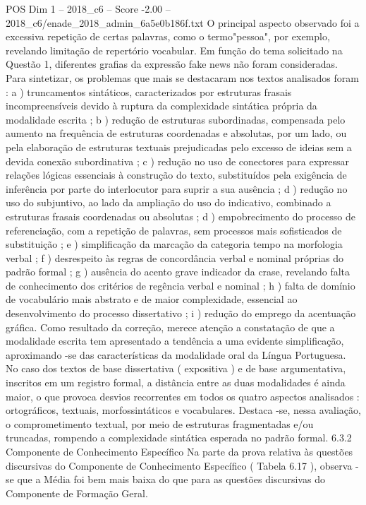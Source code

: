 \begin{textsample}{POS Dim 1 – 2018\_c6 – Score -2.00 – 2018\_c6/enade\_2018\_admin\_6a5e0b186f.txt}
O principal aspecto observado foi a excessiva repetição de certas palavras, como o termo"pessoa", por exemplo, revelando limitação de repertório vocabular.
Em função do tema solicitado na Questão 1, diferentes grafias da expressão fake news não foram consideradas.
Para sintetizar, os problemas que mais se destacaram nos textos analisados foram : a ) truncamentos sintáticos, caracterizados por estruturas frasais incompreensíveis devido à ruptura da complexidade sintática própria da modalidade escrita ; b ) redução de estruturas subordinadas, compensada pelo aumento na frequência de estruturas coordenadas e absolutas, por um lado, ou pela elaboração de estruturas textuais prejudicadas pelo excesso de ideias sem a devida conexão subordinativa ; c ) redução no uso de conectores para expressar relações lógicas essenciais à construção do texto, substituídos pela exigência de inferência por parte do interlocutor para suprir a sua ausência ; d ) redução no uso do subjuntivo, ao lado da ampliação do uso do indicativo, combinado a estruturas frasais coordenadas ou absolutas ; d ) empobrecimento do processo de referenciação, com a repetição de palavras, sem processos mais sofisticados de substituição ; e ) simplificação da marcação da categoria tempo na morfologia verbal ; f ) desrespeito às regras de concordância verbal e nominal próprias do padrão formal ; g ) ausência do acento grave indicador da crase, revelando falta de conhecimento dos critérios de regência verbal e nominal ; h ) falta de domínio de vocabulário mais abstrato e de maior complexidade, essencial ao desenvolvimento do processo dissertativo ; i ) redução do emprego da acentuação gráfica.
Como resultado da correção, merece atenção a constatação de que a modalidade escrita tem apresentado a tendência a uma evidente simplificação, aproximando -se das características da modalidade oral da Língua Portuguesa.
No caso dos textos de base dissertativa ( expositiva ) e de base argumentativa, inscritos em um registro formal, a distância entre as duas modalidades é ainda maior, o que provoca desvios recorrentes em todos os quatro aspectos analisados : ortográficos, textuais, morfossintáticos e vocabulares.
Destaca -se, nessa avaliação, o comprometimento textual, por meio de estruturas fragmentadas e/ou truncadas, rompendo a complexidade sintática esperada no padrão formal. 6.3.2 Componente de Conhecimento Específico Na parte da prova relativa às questões discursivas do Componente de Conhecimento Específico ( Tabela 6.17 ), observa -se que a Média foi bem mais baixa do que para as questões discursivas do Componente de Formação Geral.

\end{textsample}
